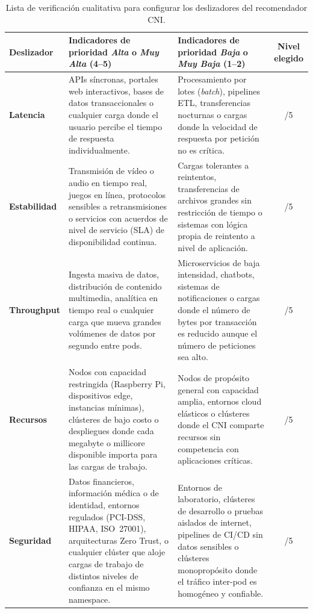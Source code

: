 \begin{table}[htbp]
\centering
\scriptsize
\caption{Lista de verificación cualitativa para configurar los deslizadores del recomendador CNI.}
\label{tab:checklist_cni}
\begin{tabularx}{\textwidth}{|l|Y|Y|c|}
\hline
\textbf{Deslizador} & \textbf{Indicadores de prioridad \emph{Alta} o \emph{Muy Alta} (4--5)} & \textbf{Indicadores de prioridad \emph{Baja} o \emph{Muy Baja} (1--2)} & \textbf{Nivel elegido} \\
\hline
\textbf{Latencia}
  & APIs síncronas, portales web interactivos, bases de datos transaccionales o cualquier carga donde el usuario percibe el tiempo de respuesta individualmente.
  & Procesamiento por lotes (\emph{batch}), pipelines ETL, transferencias nocturnas o cargas donde la velocidad de respuesta por petición no es crítica.
  & \quad\quad/5 \\
\hline
\textbf{Estabilidad}
  & Transmisión de vídeo o audio en tiempo real, juegos en línea, protocolos sensibles a retransmisiones o servicios con acuerdos de nivel de servicio (SLA) de disponibilidad continua.
  & Cargas tolerantes a reintentos, transferencias de archivos grandes sin restricción de tiempo o sistemas con lógica propia de reintento a nivel de aplicación.
  & \quad\quad/5 \\
\hline
\textbf{Throughput}
  & Ingesta masiva de datos, distribución de contenido multimedia, analítica en tiempo real o cualquier carga que mueva grandes volúmenes de datos por segundo entre pods.
  & Microservicios de baja intensidad, chatbots, sistemas de notificaciones o cargas donde el número de bytes por transacción es reducido aunque el número de peticiones sea alto.
  & \quad\quad/5 \\
\hline
\textbf{Recursos}
  & Nodos con capacidad restringida (Raspberry Pi, dispositivos edge, instancias mínimas), clústeres de bajo costo o despliegues donde cada megabyte o millicore disponible importa para las cargas de trabajo.
  & Nodos de propósito general con capacidad amplia, entornos cloud elásticos o clústeres donde el CNI comparte recursos sin competencia con aplicaciones críticas.
  & \quad\quad/5 \\
\hline
\textbf{Seguridad}
  & Datos financieros, información médica o de identidad, entornos regulados (PCI-DSS, HIPAA, ISO~27001), arquitecturas Zero Trust, o cualquier clúster que aloje cargas de trabajo de distintos niveles de confianza en el mismo namespace.
  & Entornos de laboratorio, clústeres de desarrollo o pruebas aislados de internet, pipelines de CI/CD sin datos sensibles o clústeres monopropósito donde el tráfico inter-pod es homogéneo y confiable.
  & \quad\quad/5 \\
\hline
\end{tabularx}
\end{table}

